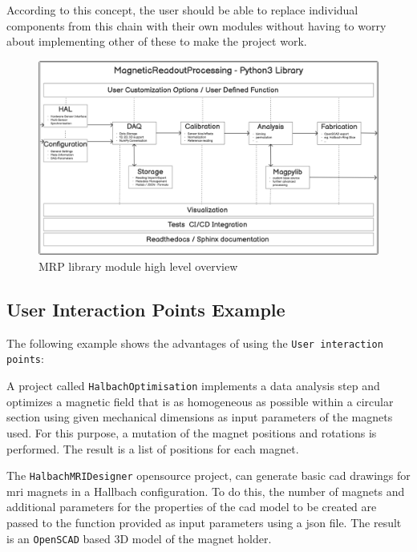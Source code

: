 \newpage

According to this concept, the user should be able to replace individual
components from this chain with their own modules without having to
worry about implementing other of these to make the project work.

\begin{figure}
\centering
\includegraphics{./generated_images/border_MRP_library_module_high_level_overview.png}
\caption{MRP library module high level overview
\label{MRP_library_module_high_level_overview.png}}
\end{figure}

\hypertarget{user-interaction-points-example}{%
\subsection{User Interaction Points
Example}\label{user-interaction-points-example}}

The following example shows the advantages of using the
\passthrough{\lstinline!User interaction points!}:

A project called \passthrough{\lstinline!HalbachOptimisation!}
\cite{HalbachOptimisation} implements a data analysis step and
optimizes a magnetic field that is as homogeneous as possible within a
circular section using given mechanical dimensions as input parameters
of the magnets used. For this purpose, a mutation of the magnet
positions and rotations is performed. The result is a list of positions
for each magnet.

The \passthrough{\lstinline!HalbachMRIDesigner!}
\cite{HalbachMRIDesigner} opensource project, can generate basic
\gls{cad} drawings for \gls{mri} magnets in a Hallbach configuration. To
do this, the number of magnets and additional parameters for the
properties of the \gls{cad} model to be created are passed to the
function provided as input parameters using a \gls{json} file. The
result is an \passthrough{\lstinline!OpenSCAD!} \cite{OpenSCAD}
based 3D model of the magnet holder.

